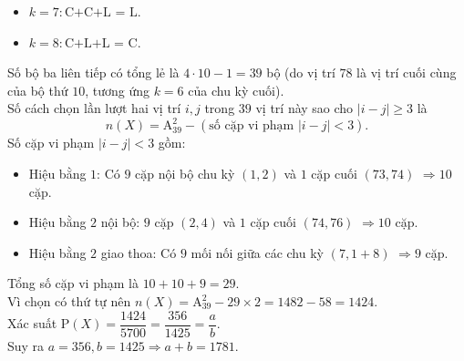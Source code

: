 \begin{ex}
{\begin{itemize}
			\item $k=7 \colon \text{C+C+L = L}$.
			\item $k=8 \colon \text{C+L+L = C}$.
		\end{itemize}
		Số bộ ba liên tiếp có tổng lẻ là $4 \cdot 10 - 1 = 39$ bộ (do vị trí $78$ là vị trí cuối cùng của bộ thứ $10$, tương ứng $k=6$ của chu kỳ cuối). \\
		Số cách chọn lần lượt hai vị trí $i, j$ trong $39$ vị trí này sao cho $|i-j| \ge 3$ là
		\[ n(X) = \mathrm{A}_{39}^2 - (\text{số cặp vi phạm } |i-j| < 3). \]
		Số cặp vi phạm $|i-j| < 3$ gồm:
		\begin{itemize}
			\item Hiệu bằng $1$: Có $9$ cặp nội bộ chu kỳ $(1,2)$ và $1$ cặp cuối $(73, 74)$ $\Rightarrow 10$ cặp.
			\item Hiệu bằng $2$ nội bộ: $9$ cặp $(2,4)$ và $1$ cặp cuối $(74, 76)$ $\Rightarrow 10$ cặp.
			\item Hiệu bằng $2$ giao thoa: Có $9$ mối nối giữa các chu kỳ $(7, 1+8)$ $\Rightarrow 9$ cặp.
		\end{itemize}
		Tổng số cặp vi phạm là $10 + 10 + 9 = 29$. \\
		Vì chọn có thứ tự nên $n(X) = \mathrm{A}_{39}^2 - 29 \times 2 = 1482 - 58 = 1424$. \\
		Xác suất $\mathrm{P}(X) = \dfrac{1424}{5700} = \dfrac{356}{1425} = \dfrac{a}{b}$. \\
		Suy ra $a = 356, b = 1425 \Rightarrow a + b = 1781$.
	}
\end{ex}

